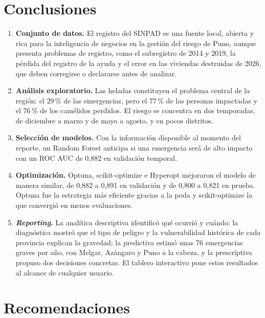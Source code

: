 \documentclass[12pt,a4paper]{article}
\begin{document}
\section{Conclusiones}

\begin{enumerate}
\item \textbf{Conjunto de datos.} El registro del SINPAD es una fuente local, abierta y rica para la inteligencia de
negocios en la gestión del riesgo de Puno, aunque presenta problemas de registro, como el subregistro de 2014 y
2019, la pérdida del registro de la ayuda y el error en las viviendas destruidas de 2026, que deben corregirse o
declararse antes de analizar.
\item \textbf{Análisis exploratorio.} Las heladas constituyen el problema central de la región: el 29\,\% de las
emergencias, pero el 77\,\% de las personas impactadas y el 76\,\% de los camélidos perdidos. El riesgo se concentra
en dos temporadas, de diciembre a marzo y de mayo a agosto, y en pocos distritos.
\item \textbf{Selección de modelos.} Con la información disponible al momento del reporte, un Random Forest anticipa si
una emergencia será de alto impacto con un ROC AUC de 0,882 en validación temporal.
\item \textbf{Optimización.} Optuna, scikit-optimize e Hyperopt mejoraron el modelo de manera similar, de 0,882 a 0,891 en
validación y de 0,800 a 0,821 en prueba. Optuna fue la estrategia más eficiente gracias a la poda y scikit-optimize
la que convergió en menos evaluaciones.
\item \textbf{\emph{Reporting}.} La analítica descriptiva identificó qué ocurrió y cuándo; la diagnóstica mostró que el
tipo de peligro y la vulnerabilidad histórica de cada provincia explican la gravedad; la predictiva estimó unas 76
emergencias graves por año, con Melgar, Azángaro y Puno a la cabeza, y la prescriptiva propuso dos decisiones
concretas. El tablero interactivo pone estos resultados al alcance de cualquier usuario.
\end{enumerate}

\section{Recomendaciones}
\end{document}
